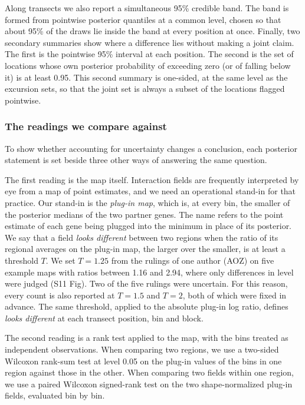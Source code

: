 \documentclass[10pt,letterpaper]{article}
\begin{document}
Along transects we also report a simultaneous 95\% credible band. The band is formed from pointwise posterior quantiles at a common level, chosen so that about 95\% of the draws lie inside the band at every position at once. Finally, two secondary summaries show where a difference lies without making a joint claim. The first is the pointwise 95\% interval at each position. The second is the set of locations whose own posterior probability of exceeding zero (or of falling below it) is at least 0.95. This second summary is one-sided, at the same level as the excursion sets, so that the joint set is always a subset of the locations flagged pointwise.

\subsubsection*{The readings we compare against}

To show whether accounting for uncertainty changes a conclusion, each posterior statement is set beside three other ways of answering the same question.

The first reading is the map itself. Interaction fields are frequently interpreted by eye from a map of point estimates, and we need an operational stand-in for that practice. Our stand-in is the \textit{plug-in map}, which is, at every bin, the smaller of the posterior medians of the two partner genes. The name refers to the point estimate of each gene being plugged into the minimum in place of its posterior. We say that a field \textit{looks different} between two regions when the ratio of its regional averages on the plug-in map, the larger over the smaller, is at least a threshold $T$. We set $T = 1.25$ from the rulings of one author (AOZ) on five example maps with ratios between 1.16 and 2.94, where only differences in level were judged (S11 Fig). Two of the five rulings were uncertain. For this reason, every count is also reported at $T = 1.5$ and $T = 2$, both of which were fixed in advance. The same threshold, applied to the absolute plug-in log ratio, defines \textit{looks different} at each transect position, bin and block.

The second reading is a rank test applied to the map, with the bins treated as independent observations. When comparing two regions, we use a two-sided Wilcoxon rank-sum test at level 0.05 on the plug-in values of the bins in one region against those in the other. When comparing two fields within one region, we use a paired Wilcoxon signed-rank test on the two shape-normalized plug-in fields, evaluated bin by bin.
\end{document}
